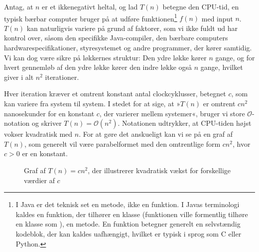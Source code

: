 Antag, at $n$ er et ikkenegativt heltal, og lad $T(n)$ betegne den CPU-tid, en typisk bærbar computer bruger på at udføre funktionen\footnote{I Java er det teknisk set en metode, ikke en funktion. I Javas terminologi kaldes en funktion, der tilhører en klasse (funktionen ville formentlig tilhøre en klasse som ), en metode. En funktion betegner generelt en selvstændig kodeblok, der kan kaldes uafhængigt, hvilket er typisk i sprog som C eller Python.}  $f(n)$ med input $n$. $T(n)$ kan naturligvis variere på grund af faktorer, som vi ikke fuldt ud har kontrol over, såsom den specifikke Java-compiler, den bærbare computers hardwarespecifikationer, styresystemet og andre programmer, der kører samtidig. Vi kan dog være sikre på løkkernes struktur: Den ydre løkke kører $n$ gange, og for hvert gennemløb af den ydre løkke kører den indre løkke også $n$ gange, hvilket giver i alt $n^2$ iterationer. 

Hver iteration kræver et omtrent konstant antal clockcyklusser, betegnet \( c \), som kan variere fra system til system. I stedet for at sige, at »$T(n)$ er omtrent \( cn^2 \) nanosekunder for en konstant \( c \), der varierer mellem systemer«, bruger vi store $\mathcal{O}$-notation og skriver \( T(n) = \mathcal{O}(n^2) \). Notationen udtrykker, at CPU-tiden højst vokser kvadratisk med \( n \). For at gøre det anskueligt kan vi se på en graf af \( T(n) \), som generelt vil være parabelformet med den omtrentlige form \( cn^2 \), hvor \( c > 0 \) er en konstant.

\begin{figure}[htbp]
    \centering
    \caption{Graf af $T(n) = cn^2$, der illustrerer kvadratisk vækst for forskellige værdier af $c$}
    \label{fig:quadratic_growth}
\end{figure}

